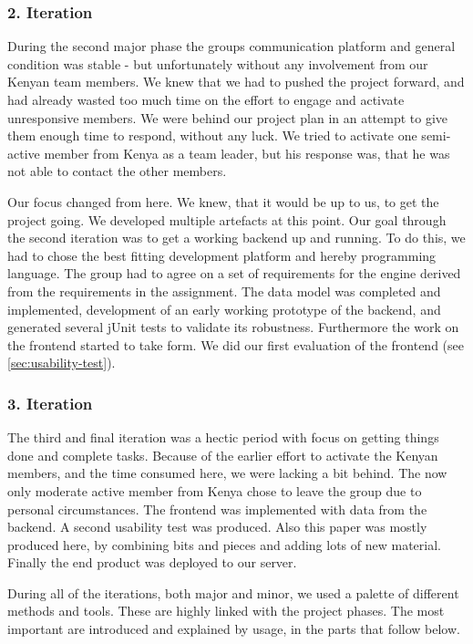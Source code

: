 \subsubsection{2. Iteration}
During the second major phase the groups communication platform and general condition was stable - but unfortunately without any involvement from our Kenyan team members. We knew that we had to pushed the project forward, and had already wasted too much time on the effort to engage and activate unresponsive members. We were behind our project plan in an attempt to give them enough time to respond, without any luck. We tried to activate one semi-active member from Kenya as a team leader, but his response was, that he was not able to contact the other members.

Our focus changed from here. We knew, that it would be up to us, to get the project going. We developed multiple artefacts at this point. Our goal through the second iteration was to get a working backend up and running. To do this, we had to chose the best fitting development platform and hereby programming language. The group had to agree on a set of requirements for the engine derived from the requirements in the assignment. The data model was completed and implemented, development of an early working prototype of the backend, and generated several jUnit tests to validate its robustness. Furthermore the work on the frontend started to take form. We did our first evaluation of the frontend (see \ref{sec:usability-test}).

\subsubsection{3. Iteration}
The third and final iteration was a hectic period with focus on getting things done and complete tasks. Because of the earlier effort to activate the Kenyan members, and the time consumed here, we were lacking a bit behind. The now only moderate active member from Kenya chose to leave the group due to personal circumstances. The frontend was implemented with data from the backend. A second usability test was produced. Also this paper was mostly produced here, by combining bits and pieces and adding lots of new material. Finally the end product was deployed to our server.

During all of the iterations, both major and minor, we used a palette of different methods and tools. These are highly linked with the project phases. The most important are introduced and explained by usage, in the parts that follow below.

